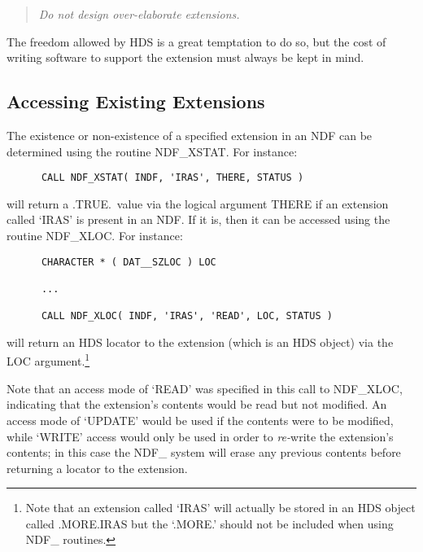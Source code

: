 \documentclass[twoside,11pt]{article}
\newcommand{\htmlref}[2]{#1}
\newcommand{\xref}[3]{#1}
\newcommand{\xlabel}[1]{}
\newcommand{\st}[1]{{\em{#1}}}
\begin{document}
\begin{quote}
\begin{center}
\st{Do not design over-elaborate extensions.}
\end{center}
\end{quote}

The freedom allowed by HDS is a great temptation to do so, but the cost of
writing software to support the extension must always be kept in mind. 

\subsection{\xlabel{accessing_existing_extensions}\label{ss:accessingexistingextensions}Accessing Existing Extensions}

The existence or non-existence of a specified extension in an NDF can be
determined using the routine \htmlref{NDF\_XSTAT}{NDF_XSTAT}. 
For instance:

\small
\begin{verbatim}
      CALL NDF_XSTAT( INDF, 'IRAS', THERE, STATUS )
\end{verbatim}
\normalsize

will return a .TRUE.\ value via the logical argument THERE if an extension 
called `IRAS' is present in an NDF.
If it is, then it can be accessed using the routine \htmlref{NDF\_XLOC}{NDF_XLOC}.
For instance:

\small
\begin{verbatim}
      CHARACTER * ( DAT__SZLOC ) LOC

      ...

      CALL NDF_XLOC( INDF, 'IRAS', 'READ', LOC, STATUS )
\end{verbatim}
\normalsize

will return an \xref{HDS locator}{sun92}{using_locators} to the
extension (which is an \xref{HDS object}{sun92}{HDS_objects}) via the
LOC argument.\footnote{Note that an extension called `IRAS' will
actually be stored in an HDS object called .MORE.IRAS but the `.MORE.'
should not be included when using NDF\_ routines.}

Note that an access mode of `READ' was specified in this call to NDF\_XLOC,
indicating that the extension's contents would be read but not modified. 
An access mode of `UPDATE' would be used if the contents were to be
modified, while `WRITE' access would only be used in order to \st{re-\/}write
the extension's contents; in this case the NDF\_ system will erase any
previous contents before returning a locator to the extension. 
\end{document}
